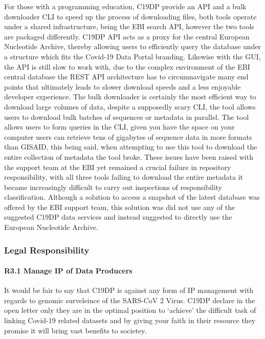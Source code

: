 \documentclass{article}
\begin{document}
For those with a programming education, C19DP provide an API and a bulk
downloader CLI to speed up the process of downloading files, both tools
operate under a shared infrastructure, being the EBI search API, however
the two tools are packaged differently. C19DP API acts as a proxy for
the central European Nucleotide Archive, thereby allowing users to
efficiently query the database under a structure which fits the Covid-19
Data Portal branding. Likewise with the GUI, the API is still slow to
work with, due to the complex environment of the EBI central database
the REST API architecture has to circumnavigate many end points that
ultimately leads to slower download speeds and a less enjoyable
developer experience. The bulk downloader is certainly the most
efficient way to download large volumes of data, despite a supposedly
scary CLI, the tool allows users to download bulk batches of sequences
or metadata in parallel. The tool allows users to form queries in the
CLI, given you have the space on your computer users can retrieve tens
of gigabytes of sequence data in more formats than GISAID, this being
said, when attempting to use this tool to download the entire collection
of metadata the tool broke. These issues have been raised with the
support team at the EBI yet remained a crucial failure in repository
responsibility, with all three tools failing to download the entire
metadata it became increasingly difficult to carry out inspections of
responsibility classification. Although a solution to access a snapshot
of the latest database was offered by the EBI support team, this
solution was did not use any of the suggested C19DP data services and
instead suggested to directly use the European Nucleotide Archive.

\hypertarget{legal-responsibility-2}{%
\subsubsection{Legal Responsibility}\label{legal-responsibility-2}}

\hypertarget{r3.1-manage-ip-of-data-producers-1}{%
\paragraph{R3.1 Manage IP of Data
Producers}\label{r3.1-manage-ip-of-data-producers-1}}

It would be fair to say that C19DP is against any form of IP management
with regards to genomic surveleince of the SARS-CoV 2 Virus. C19DP
declare in the open letter only they are in the optimal position to
`achieve' the difficult task of linking Covid-19 related datasets and by
giving your faith in their resource they promise it will bring vast
benefits to societey.
\end{document}
